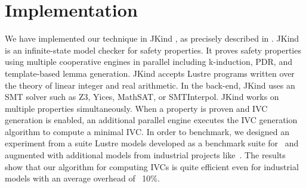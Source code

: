\section{Implementation}
\label{sec:impl}

We have implemented our technique in JKind \cite{jkind}, as precisely described in \cite{Ghass16}. JKind is an infinite-state model checker for safety properties. It proves safety properties using multiple cooperative engines in parallel including k-induction, PDR, and template-based lemma generation. JKind accepts
Lustre programs written over the theory of linear integer and real
arithmetic. In the back-end, JKind uses an SMT solver such as
Z3, Yices, MathSAT, or SMTInterpol.
JKind works on multiple properties simultaneously. When a
property is proven and IVC generation is enabled, an additional
parallel engine executes the IVC generation algorithm to compute a minimal
IVC. In order to benchmark, we designed an experiment from a suite Lustre models developed
as a benchmark suite for~\cite{Hagen08:FMCAD} and augmented with additional models from industrial projects like~\cite{QFCS15:backes,hilt2013}. The results show that our algorithm for computing IVCs is quite efficient even for industrial models with an average overhead of ~10\%.